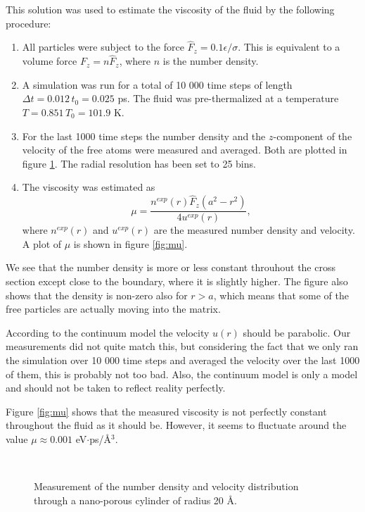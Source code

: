 \documentclass[12pt]{article}
\begin{document}
This solution was used to estimate the viscosity of the fluid by the following procedure:
\begin{enumerate}
 \item All particles were subject to the force $\hat F_z = 0.1\epsilon/\sigma$. This is equivalent to a volume force $F_z = n \hat F_z$, where $n$ is the number density.
 \item A simulation was run for a total of 10 000 time steps of length $\Delta t = 0.012\,t_0 = 0.025$ ps. The fluid was pre-thermalized at a temperature $T = 0.851\,T_0 = 101.9$ K.
 \item For the last 1000 time steps the number density and the $z$-component of the velocity of the free atoms were measured and averaged. Both are plotted in figure \ref{fig:numberAndVelocity}. The radial resolution has been set to 25 bins.
 \item The viscosity was estimated as
 \begin{equation}
  \label{eq:mu}
 \mu = \frac{n^{exp}(r)\hat F_z (a^2 - r^2)}{4 u^{exp}(r)},
 \end{equation}
 where $n^{exp}(r)$ and $u^{exp}(r)$ are the measured number density and velocity. A plot of $\mu$ is shown in figure \ref{fig:mu}.
\end{enumerate}

We see that the number density is more or less constant throuhout the cross section except close to the boundary, where it is slightly higher. The figure also shows that the density
is non-zero also for $r>a$, which means that some of the free particles are actually moving into the matrix.

According to the continuum model the velocity $u(r)$ should be parabolic. Our measurements did not quite match this, but considering the fact that we only ran the simulation over 10 000 time steps and averaged
the velocity over the last 1000 of them, this is probably not too bad. Also, the continuum model is only a model and should not be taken to reflect reality perfectly.

Figure \ref{fig:mu} shows that the measured viscosity is not perfectly constant throughout the fluid as it should be. However, it seems to fluctuate around the value $\mu\approx 0.001$ eV$\cdot$ps/Å$^3$.

\begin{figure}[!ht]
    \begin{center}
        \hspace{5mm}
        \\ 
    \end{center}
    \caption{Measurement of the number density and velocity distribution through a nano-porous cylinder of radius 20 Å.}
    \label{fig:numberAndVelocity}
\end{figure}
\end{document}
